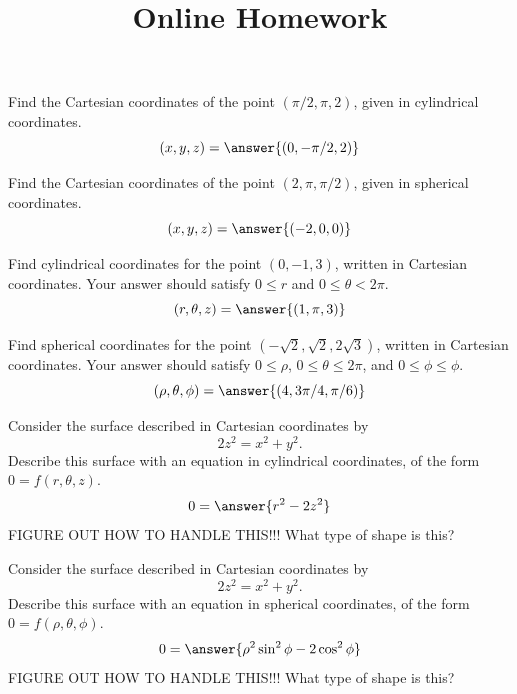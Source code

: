 \documentclass{ximera}
\title{Online Homework}
\begin{document}
\begin{abstract}
\end{abstract}
\maketitle

\begin{problem}
Find the Cartesian coordinates of the point $(\pi/2, \pi, 2)$, given in cylindrical coordinates.
\[
(x,y,z) = \answer{(0, -\pi/2, 2)}
\]
\end{problem}

\begin{problem}
Find the Cartesian coordinates of the point $(2, \pi, \pi/2)$, given in spherical coordinates.
\[
(x,y,z) = \answer{(-2,0,0)}
\]
\end{problem}

\begin{problem}
Find cylindrical coordinates for the point $\left(0, -1, 3\right)$, written in Cartesian coordinates. Your answer should satisfy $0\leq r$ and $0\leq \theta <2\pi$.
\[
(r, \theta, z) = \answer{(1, \pi, 3)}
\]
\end{problem}

\begin{problem}
Find spherical coordinates for the point $\left(-\sqrt{2}, \sqrt{2}, 2\sqrt{3}\right)$, written in Cartesian coordinates. Your answer should satisfy $0\leq \rho$, $0\leq \theta \leq 2\pi$, and $0\leq \phi \leq \phi$.
\[
(\rho, \theta, \phi) = \answer{(4, 3\pi/4, \pi/6)}
\]
\end{problem}

\begin{problem}
Consider the surface described in Cartesian coordinates by
\[
2z^2 = x^2 +y^2.
\]
Describe this surface with an equation in cylindrical coordinates, of the form $0=f(r,\theta, z)$.
\[
0=\answer{r^2-2z^2}
\]
FIGURE OUT HOW TO HANDLE THIS!!!
What type of shape is this?
\begin{multipleChoice}
\end{multipleChoice}
\end{problem}

\begin{problem}
Consider the surface described in Cartesian coordinates by
\[
2z^2 = x^2 +y^2.
\]
Describe this surface with an equation in spherical coordinates, of the form $0=f(\rho, \theta, \phi)$.
\[
0=\answer{\rho^2\sin^2\phi - 2\cos^2\phi}
\]
FIGURE OUT HOW TO HANDLE THIS!!!
What type of shape is this?
\begin{multipleChoice}
\end{multipleChoice}
\end{problem}
\end{document}
